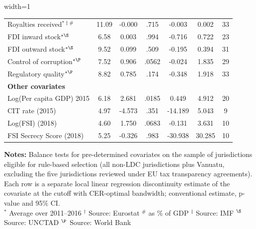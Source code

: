 \begin{table}[htbp]
\begin{adjustbox}{width=1\textwidth}
\begin{tabular}{l*{6}{c}}
Royalties received\(^{*\ddagger\#}\)&    11.09&   -0.000&     .715&   -0.003&    0.002&       33\\
FDI inward stock\(^{*\S}\)&     6.58&    0.003&     .994&   -0.716&    0.722&       23\\
FDI outward stock\(^{*\S}\)&     9.52&    0.099&     .509&   -0.195&    0.394&       31\\
Control of corruption\(^{*\P}\)&     7.52&    0.906&    .0562&   -0.024&    1.835&       29\\
Regulatory quality\(^{*\P}\)&     8.82&    0.785&     .174&   -0.348&    1.918&       33\\
\midrule
{\bf Other covariates}&         &         &         &         &         &         \\
Log(Per capita GDP) 2015&     6.18&    2.681&    .0185&    0.449&    4.912&       20\\
CIT rate (2015)&     4.97&   -4.573&     .351&  -14.189&    5.043&        9\\
Log(FSI) (2018)&     4.60&    1.750&    .0683&   -0.131&    3.631&       10\\
FSI Secrecy Score (2018)&     5.25&   -0.326&     .983&  -30.938&   30.285&       10\\
\bottomrule \end{tabular} \end{adjustbox} \begin{minipage}{0.95\textwidth} \footnotesize {\bf Notes:} Balance tests for pre-determined covariates on the sample of jurisdictions eligible for rule-based selection (all non-LDC jurisdictions plus Vanuatu, excluding the five jurisdictions reviewed under EU tax transparency agreements). Each row is a separate local linear regression discontinuity estimate of the covariate at the cutoff  with CER-optimal bandwidth; conventional estimate, p-value and 95\% CI. \\ \(^{*}\) Average over 2011--2016 \quad \(^{\dag}\) Source: Eurostat \quad \(^{\#}\) as \% of GDP \quad \(^{\ddagger}\) Source: IMF \quad \(^{\S}\) Source: UNCTAD \quad \(^{\P}\) Source: World Bank \end{minipage} \end{table}
